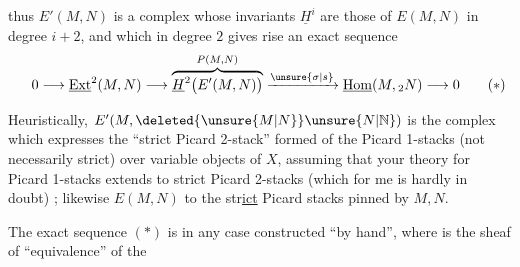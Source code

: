 
thus $E'(M,N)$ is a complex whose invariants $\underline{H}^{i}$ are those of $E(M,N)$ in degree $i+2$, and which in degree $2$ gives rise  an exact sequence
\[
0\longrightarrow\underline{\mathrm{Ext}}^{2}(M,N)\longrightarrow
\overbrace{\underline{H}^{2}\bigl(E'(M,N)\bigr)}^{P(M,N)}
\xrightarrow{\unsure{\sigma|s}}\underline{\mathrm{Hom}}(M,{}_{2}N)\longrightarrow 0
\tag*{\makebox[0pt][r]{\makebox[\displaywidth][l]{$(*)$}}}
\]

Heuristically, $E'(M,\deleted{\unsure{M|N}}\unsure{N|\mathbb{N}})$ is the complex which expresses the ``strict Picard 2-stack'' formed of the Picard 1-stacks (not necessarily strict)  over variable objects of $X$, assuming that your theory for  Picard 1-stacks extends to strict Picard 2-stacks (which for me is hardly in doubt) ; likewise $E(M,N)$  to the str\uline{ict} Picard stacks pinned by $M,N$.

The exact sequence $(*)$ is in any case constructed  ``by hand'', where    is the sheaf of    ``equivalence'' of the

